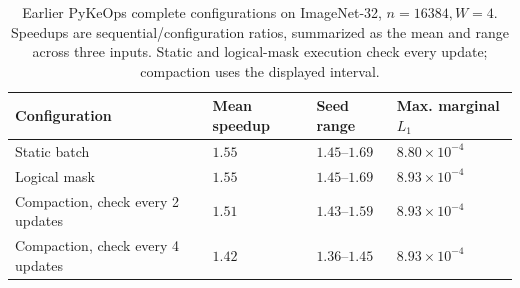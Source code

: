 \begin{table}[!htbp]
\centering
\caption{Earlier PyKeOps complete configurations on ImageNet-32, $n=16384,W=4$. Speedups are sequential/configuration ratios, summarized as the mean and range across three inputs. Static and logical-mask execution check every update; compaction uses the displayed interval.}
\label{tab:backend-history}
\small
\begin{tabular}{@{}llll@{}}
\toprule
Configuration & Mean speedup & Seed range & Max. marginal $L_1$ \\
\midrule
Static batch & $1.55$ & $1.45$--$1.69$ & $8.80\times10^{-4}$ \\
Logical mask & $1.55$ & $1.45$--$1.69$ & $8.93\times10^{-4}$ \\
Compaction, check every 2 updates & $1.51$ & $1.43$--$1.59$ & $8.93\times10^{-4}$ \\
Compaction, check every 4 updates & $1.42$ & $1.36$--$1.45$ & $8.93\times10^{-4}$ \\
\bottomrule
\end{tabular}
\end{table}
